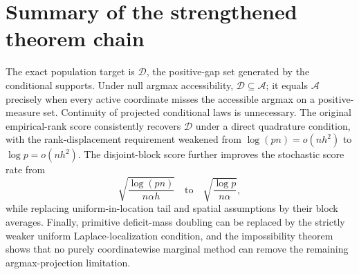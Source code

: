 \documentclass[11pt]{article}
\theoremstyle{definition}\newtheorem{definition}[theorem]{Definition}
\newcommand{\A}{\mathcal A}
\newcommand{\D}{\mathcal D}
\begin{document}
\section{Summary of the strengthened theorem chain}

The exact population target is $\D$, the positive-gap set generated by the
conditional supports.  Under null argmax accessibility, $\D\subseteq\A$; it
equals $\A$ precisely when every active coordinate misses the accessible
argmax on a positive-measure set.  Continuity of projected conditional laws
is unnecessary.  The original empirical-rank score consistently recovers
$\D$ under a direct quadrature condition, with the rank-displacement
requirement weakened from $\log(pn)=o(nh^2)$ to
$\log p=o(nh^2)$.  The disjoint-block score further improves the stochastic
score rate from
\[
 \sqrt{\frac{\log(pn)}{n\alpha h}}
 \quad\text{to}\quad
 \sqrt{\frac{\log p}{n\alpha}},
\]
while replacing uniform-in-location tail and spatial assumptions by their
block averages.  Finally, primitive deficit-mass doubling can be replaced by
the strictly weaker uniform Laplace-localization condition, and the
impossibility theorem shows that no purely coordinatewise marginal method can
remove the remaining argmax-projection limitation.
\end{document}
